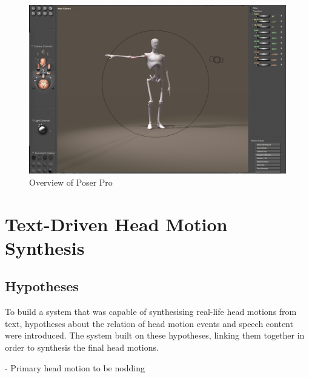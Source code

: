 \documentclass[bsc,frontabs,twoside,singlespacing,parskip]{infthesis}
\begin{document}
\begin{figure}
	\centering
		\includegraphics[width=1.0\textwidth]{poser.png}
		\caption{Overview of Poser Pro}
\end{figure}

\chapter{Text-Driven Head Motion Synthesis}


\section{Hypotheses}

To build a system that was capable of synthesising real-life head motions from text, hypotheses about the relation of head motion events and speech content were introduced. The system built on these hypotheses, linking them together in order to synthesis the final head motions. 

\cite{first_paper} 
- Primary head motion to be nodding \\
\end{document}
